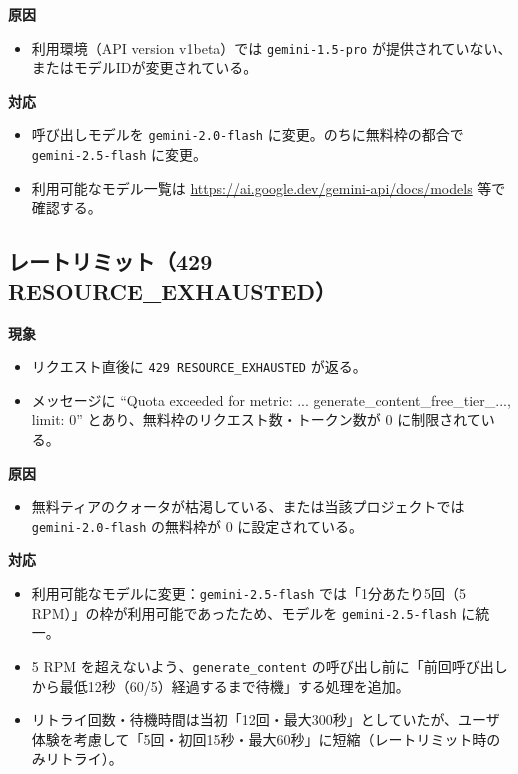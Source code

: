 \documentclass[11pt,a4paper]{jsarticle}
\begin{document}
\textbf{原因}
\begin{itemize}[nosep]
  \item 利用環境（API version v1beta）では \texttt{gemini-1.5-pro} が提供されていない、またはモデルIDが変更されている。
\end{itemize}

\textbf{対応}
\begin{itemize}[nosep]
  \item 呼び出しモデルを \texttt{gemini-2.0-flash} に変更。のちに無料枠の都合で \texttt{gemini-2.5-flash} に変更。
  \item 利用可能なモデル一覧は \url{https://ai.google.dev/gemini-api/docs/models} 等で確認する。
\end{itemize}

\subsection{レートリミット（429 RESOURCE\_EXHAUSTED）}
\textbf{現象}
\begin{itemize}[nosep]
  \item リクエスト直後に \texttt{429 RESOURCE\_EXHAUSTED} が返る。
  \item メッセージに ``Quota exceeded for metric: ... generate\_content\_free\_tier\_..., limit: 0'' とあり、無料枠のリクエスト数・トークン数が 0 に制限されている。
\end{itemize}

\textbf{原因}
\begin{itemize}[nosep]
  \item 無料ティアのクォータが枯渇している、または当該プロジェクトでは \texttt{gemini-2.0-flash} の無料枠が 0 に設定されている。
\end{itemize}

\textbf{対応}
\begin{itemize}[nosep]
  \item 利用可能なモデルに変更：\texttt{gemini-2.5-flash} では「1分あたり5回（5 RPM）」の枠が利用可能であったため、モデルを \texttt{gemini-2.5-flash} に統一。
  \item 5 RPM を超えないよう、\texttt{generate\_content} の呼び出し前に「前回呼び出しから最低12秒（60/5）経過するまで待機」する処理を追加。
  \item リトライ回数・待機時間は当初「12回・最大300秒」としていたが、ユーザ体験を考慮して「5回・初回15秒・最大60秒」に短縮（レートリミット時のみリトライ）。
\end{itemize}
\end{document}
